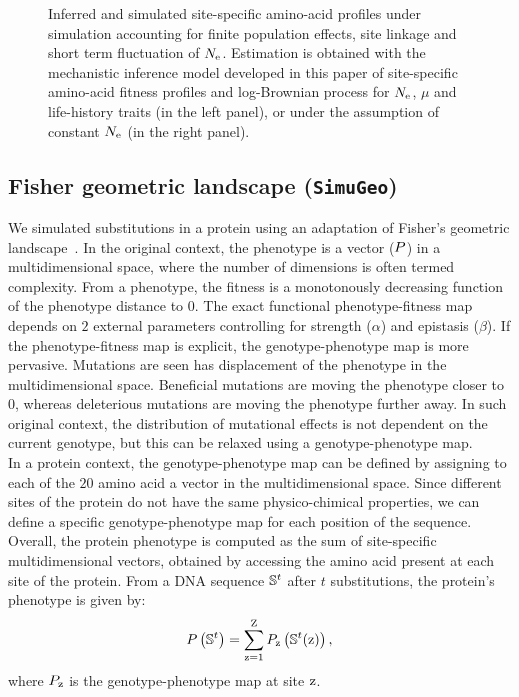 \documentclass{article}
\begin{document}
\begin{figure}[H]
\begin{minipage}{0.49\linewidth}
		\end{minipage}
		\caption[Inferred site amino-acid profiles for \texttt{SimuPoly}]{
		Inferred and simulated site-specific amino-acid profiles under simulation accounting for finite population effects, site linkage and short term fluctuation of $N_{\text{e}}$.
		Estimation is obtained with the mechanistic inference model developed in this paper of site-specific amino-acid fitness profiles and log-Brownian process for $N_{\text{e}}$, $\mu$ and life-history traits (in the left panel), or under the assumption of constant $N_{\text{e}}$ (in the right panel).}
	\end{figure}

	\subsection{Fisher geometric landscape (\texttt{SimuGeo})}
	\label{subsec:fisher-geometric-landscape}

	We simulated substitutions in a protein using an adaptation of Fisher's geometric landscape~\citep{Tenaillon2014,Blanquart2016}.
	In the original context, the {phenotype} is a vector ($P$) in a multidimensional space, where the number of dimensions is often termed complexity.
	From a {phenotype}, the fitness is a monotonously decreasing function of the {phenotype} distance to $0$.
	The exact functional phenotype-fitness map depends on $2$ external parameters controlling for strength ($\alpha$) and epistasis ($\beta$).
	If the phenotype-fitness map is explicit, the genotype-phenotype map is more pervasive.
	Mutations are seen has displacement of the {phenotype} in the multidimensional space.
	Beneficial mutations are moving the {phenotype} closer to $0$, whereas deleterious mutations are moving the {phenotype} further away.
	In such original context, the distribution of mutational effects is not dependent on the current genotype, but this can be relaxed using a genotype-phenotype map.\\

	In a protein context, the genotype-phenotype map can be defined by assigning to each of the $20$ amino acid a vector in the multidimensional space.
	Since different sites of the protein do not have the same physico-chimical properties, we can define a specific genotype-phenotype map for each position of the sequence.
	Overall, the protein {phenotype} is computed as the sum of site-specific multidimensional vectors, obtained by accessing the amino acid present at each site of the protein.
	From a {DNA} sequence $\mathbb{S}^t$ after $t$ substitutions, the protein's {phenotype} is given by:
	\begin{equation}
		P\left(\mathbb{S}^{t}\right) = \sum\limits_{\text{z}=1}^{\text{Z}} P_{\text{z}} \left(\mathbb{S}^t(\text{z}) \right),
	\end{equation}
	where $P_{\text{z}}$ is the genotype-phenotype map at site $\text{z}$.\\
\end{document}
